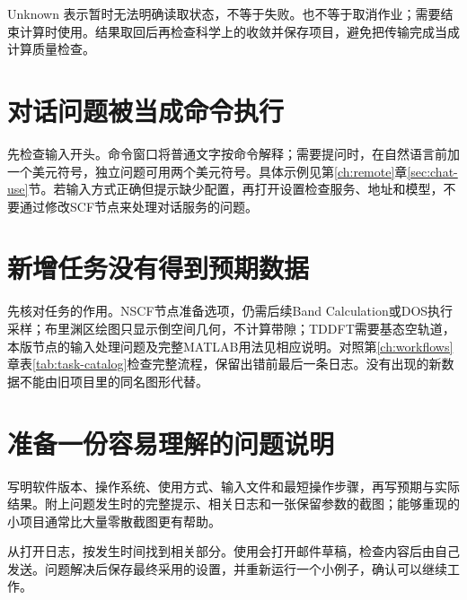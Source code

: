 Unknown 表示暂时无法明确读取状态，不等于失败。也不等于取消作业；需要结束计算时使用。结果取回后再检查科学上的收敛并保存项目，避免把传输完成当成计算质量检查。

\section{对话问题被当成命令执行}

先检查输入开头。命令窗口将普通文字按命令解释；需要提问时，在自然语言前加一个美元符号，独立问题可用两个美元符号。具体示例见第\ref{ch:remote}章\ref{sec:chat-use}节。若输入方式正确但提示缺少配置，再打开设置检查服务、地址和模型，不要通过修改SCF节点来处理对话服务的问题。

\section{新增任务没有得到预期数据}

先核对任务的作用。NSCF节点准备选项，仍需后续Band Calculation或DOS执行采样；布里渊区绘图只显示倒空间几何，不计算带隙；TDDFT需要基态空轨道，本版节点的输入处理问题及完整MATLAB\regmark{}用法见相应说明。对照第\ref{ch:workflows}章表\ref{tab:task-catalog}检查完整流程，保留出错前最后一条日志。没有出现的新数据不能由旧项目里的同名图形代替。


\section{准备一份容易理解的问题说明}

写明软件版本、操作系统、使用方式、输入文件和最短操作步骤，再写预期与实际结果。附上问题发生时的完整提示、相关日志和一张保留参数的截图；能够重现的小项目通常比大量零散截图更有帮助。

从打开日志，按发生时间找到相关部分。使用会打开邮件草稿，检查内容后由自己发送。问题解决后保存最终采用的设置，并重新运行一个小例子，确认可以继续工作。
